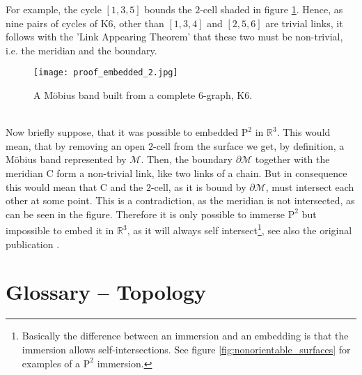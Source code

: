 For example, the cycle $[1,3,5]$ bounds the $2$-cell shaded in figure \ref{fig:proof_embedded_2}.
Hence, as nine pairs of cycles of $\mathrm{K}6$, other than $[1,3,4]$ and $[2,5,6]$ are trivial links, it follows with the 'Link Appearing Theorem' that these two must be non-trivial, i.e. the meridian and the boundary.
\begin{figure}[ht]
\centering
\texttt{[image: proof\_embedded\_2.jpg]}
\caption{A Möbius band built from a complete $6$-graph, $\mathrm{K}6$.}
\label{fig:proof_embedded_2}
\end{figure}\\
Now briefly suppose, that it was possible to embedded $\mathrm{P}^{2}$ in $\mathbb{R}^{3}$.
This would mean, that by removing an open $2$-cell from the surface we get, by definition, a Möbius band represented by $\mathcal{M}$.
Then, the boundary $\partial \mathcal{M}$ together with the meridian $\mathrm{C}$ form a non-trivial link, like two links of a chain.
But in consequence this would mean that $\mathrm{C}$ and the $2$-cell, as it is bound by $\partial \mathcal{M}$, must intersect each other at some point.
This is a contradiction, as the meridian is not intersected, as can be seen in the figure.
Therefore it is only possible to immerse $\mathrm{P}^{2}$ but impossible to embed it in $\mathbb{R}^{3}$, as it will always self intersect\footnote{ Basically the difference between an immersion and an embedding is that the immersion allows self-intersections. See figure \ref{fig:nonorientable_surfaces} for examples of a $\mathrm{P}^{2}$ immersion.}, see also the original publication \citep[][pp.862-864]{Maehara1993}.


\newpage
\section{Glossary -- Topology}
\label{appendix_glossary}

